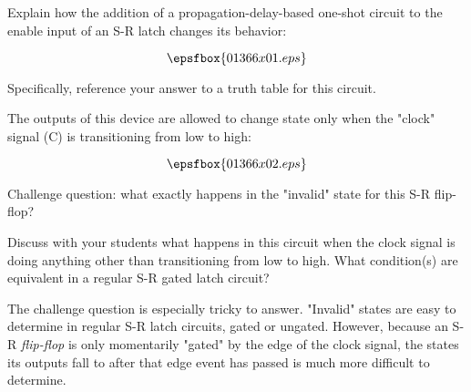 

Explain how the addition of a propagation-delay-based one-shot circuit to the enable input of an S-R latch changes its behavior:

$$\epsfbox{01366x01.eps}$$

Specifically, reference your answer to a truth table for this circuit.







The outputs of this device are allowed to change state only when the "clock" signal (C) is transitioning from low to high:

$$\epsfbox{01366x02.eps}$$

\vskip 10pt

Challenge question: what exactly happens in the "invalid" state for this S-R flip-flop?







Discuss with your students what happens in this circuit when the clock signal is doing anything other than transitioning from low to high.  What condition(s) are equivalent in a regular S-R gated latch circuit?

The challenge question is especially tricky to answer.  "Invalid" states are easy to determine in regular S-R latch circuits, gated or ungated.  However, because an S-R {\it flip-flop} is only momentarily "gated" by the edge of the clock signal, the states its outputs fall to after that edge event has passed is much more difficult to determine.




